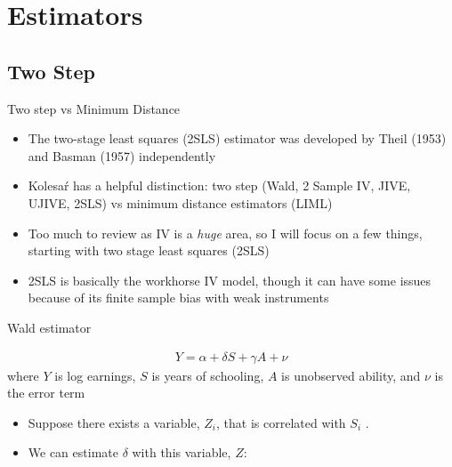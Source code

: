 \documentclass{beamer}
\begin{document}
\section{Estimators}

\subsection{Two Step}

\begin{frame}{Two step vs Minimum Distance}

  \begin{itemize}
    \item The two-stage least squares (2SLS) estimator was developed by Theil (1953) and Basman (1957) independently
    \item Kolesa\'r has a helpful distinction: two step (Wald, 2 Sample IV, JIVE, UJIVE, 2SLS) vs minimum distance estimators (LIML)
    \item Too much to review as IV is a \emph{huge} area, so I will focus on a few things, starting with two stage least squares (2SLS)
    \item 2SLS is basically the workhorse IV model, though it can have some issues because of its finite sample bias with weak instruments
  \end{itemize}

\end{frame}




\begin{frame}{Wald estimator}

  \begin{eqnarray*}
    Y = \alpha + \delta S + \gamma A + \nu
  \end{eqnarray*}
  where $Y$ is log earnings, $S$ is years of schooling, $A$ is unobserved ability, and $\nu$ is the error term

  \begin{itemize}
    \item Suppose there exists a variable, $Z_i$, that is correlated with $S_i$ .
    \item We can estimate $\delta$ with this variable, $Z$:
  \end{itemize}

\end{frame}
\end{document}

